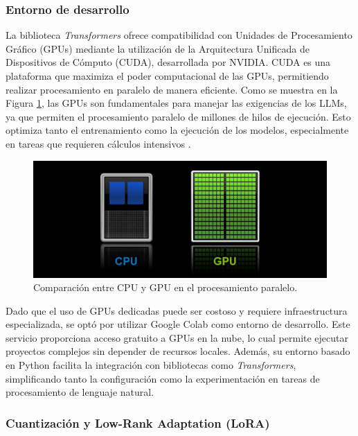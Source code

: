 \subsubsection{Entorno de desarrollo}

La biblioteca \textit{Transformers} ofrece compatibilidad con Unidades de Procesamiento Gráfico (GPUs) mediante la utilización de la Arquitectura Unificada de Dispositivos de Cómputo (CUDA), desarrollada por NVIDIA. CUDA es una plataforma que maximiza el poder computacional de las GPUs, permitiendo realizar procesamiento en paralelo de manera eficiente. Como se muestra en la Figura \ref{fig:cpu_gpu}, las GPUs son fundamentales para manejar las exigencias de los LLMs, ya que permiten el procesamiento paralelo de millones de hilos de ejecución. Esto optimiza tanto el entrenamiento como la ejecución de los modelos, especialmente en tareas que requieren cálculos intensivos \cite{nvidia2024cuda}.

\vspace{0.5cm}
\begin{figure}[h] \begin{center} \includegraphics[height=5.5 cm]{plantilla/GPU.png} \caption{Comparación entre CPU y GPU en el procesamiento paralelo.} \label{fig:cpu_gpu} \end{center} \end{figure}

Dado que el uso de GPUs dedicadas puede ser costoso y requiere infraestructura especializada, se optó por utilizar Google Colab como entorno de desarrollo. Este servicio proporciona acceso gratuito a GPUs en la nube, lo cual permite ejecutar proyectos complejos sin depender de recursos locales. Además, su entorno basado en Python facilita la integración con bibliotecas como \textit{Transformers}, simplificando tanto la configuración como la experimentación en tareas de procesamiento de lenguaje natural.



\subsubsection{Cuantización y Low-Rank Adaptation (LoRA)}

